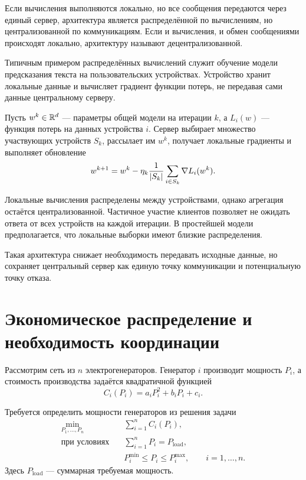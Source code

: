 Если вычисления выполняются локально, но все сообщения передаются
через единый сервер, архитектура является распределённой по
вычислениям, но централизованной по коммуникациям. Если и вычисления,
и обмен сообщениями происходят локально, архитектуру называют
децентрализованной.



Типичным примером распределённых вычислений служит обучение модели
предсказания текста на пользовательских устройствах. Устройство
хранит локальные данные и вычисляет градиент функции потерь, не
передавая сами данные центральному серверу.

Пусть \(w^k\in\mathbb{R}^d\) --- параметры общей модели на итерации \(k\),
а \(L_i(w)\) --- функция потерь на данных устройства \(i\).
Сервер выбирает множество участвующих устройств \(S_k\), рассылает
им \(w^k\), получает локальные градиенты и выполняет обновление
\[
    w^{k+1}
    =
    w^k
    -
    \eta_k
    \frac{1}{\left\lvert S_k\right\rvert}
    \sum_{i\in S_k}
    \nabla L_i(w^k).
\]

Локальные вычисления распределены между устройствами, однако
агрегация остаётся централизованной. Частичное участие клиентов
позволяет не ожидать ответа от всех устройств на каждой итерации.
В простейшей модели предполагается, что локальные выборки имеют
близкие распределения.

Такая архитектура снижает необходимость передавать исходные данные,
но сохраняет центральный сервер как единую точку коммуникации и
потенциальную точку отказа.

\section{Экономическое распределение и необходимость координации}

Рассмотрим сеть из \(n\) электрогенераторов. Генератор \(i\)
производит мощность \(P_i\), а стоимость производства задаётся
квадратичной функцией
\[
    C_i(P_i)
    =
    a_iP_i^2+b_iP_i+c_i.
\]

\begin{problem}
Требуется определить мощности генераторов из решения задачи
\[
    \begin{aligned}
        \min_{P_1,\ldots,P_n}
        \quad&
        \sum_{i=1}^{n}C_i(P_i),
        \\
        \text{при условиях}
        \quad&
        \sum_{i=1}^{n}P_i=P_{\mathrm{load}},
        \\
        &
        P_i^{\min}\le P_i\le P_i^{\max},
        \qquad i=1,\ldots,n.
    \end{aligned}
\]
Здесь \(P_{\mathrm{load}}\) --- суммарная требуемая мощность.
\end{problem}

